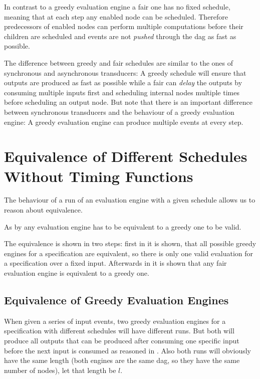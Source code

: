In contrast to a greedy evaluation engine a fair one has no fixed schedule, meaning that at each step any enabled node can be scheduled.
Therefore predecessors of enabled nodes can perform multiple computations before their children are scheduled and events are not \emph{pushed} through the \gls{dag} as fast as possible.

The difference between greedy and fair schedules are similar to the ones of synchronous and asynchronous transducers: A greedy schedule will ensure that outputs are produced as fast as possible while a fair can \emph{delay} the outputs by consuming multiple inputs first and scheduling internal nodes multiple times before scheduling an output node.
But note that there is an important difference between synchronous transducers and the behaviour of a greedy evaluation engine: A greedy evaluation engine can produce multiple events at every step.

\section{Equivalence of Different Schedules Without Timing Functions}
\label{sec:behaviours:equivalence_without_timing}

The behaviour of a run of an evaluation engine with a given schedule allows us to reason about equivalence.

As by  any evaluation engine has to be equivalent to a greedy one to be valid.

The equivalence is shown in two steps: first in  it is shown, that all possible greedy engines for a specification are equivalent, so there is only one valid evaluation for a specification over a fixed input.
Afterwards in  it is shown that any fair evaluation engine is equivalent to a greedy one.


\subsection{Equivalence of Greedy Evaluation Engines}
\label{sec:behaviours:equivalence_without_timing:greedy}

When given a series of input events, two greedy evaluation engines for a specification with different schedules will have different runs.
But both will produce all outputs that can be produced after consuming one specific input before the next input is consumed as reasoned in .
Also both runs will obviously have the same length (both engines are the same \gls{dag}, so they have the same number of nodes), let that length be \(l\).


